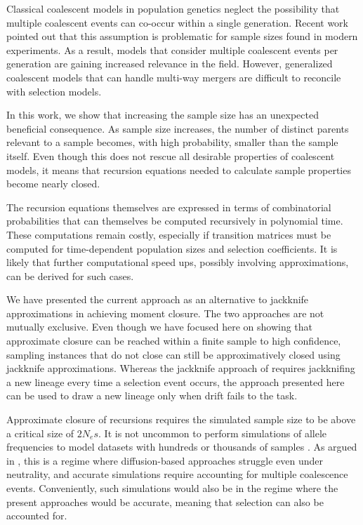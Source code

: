 \documentclass[review]{elsarticle}
\begin{document}
Classical coalescent models in population genetics neglect the possibility that multiple coalescent events 
can co-occur within a single generation. 
Recent work \citep{BhaskarEtAl2014,NelsonEtAl2019} pointed out that this
assumption is problematic for sample sizes found in modern experiments. As a result, models
that consider multiple coalescent events per generation are gaining increased relevance in the field.
However, generalized coalescent models that can handle multi-way mergers are difficult to reconcile 
with selection models.

In this work, we show that increasing the sample size has an unexpected beneficial consequence. 
As sample size increases, the number of distinct parents relevant to a sample becomes, 
with high probability, smaller than the sample itself. Even though this does not rescue
all desirable properties of coalescent models, it means that recursion equations 
needed to calculate sample properties become nearly closed. 

The recursion equations themselves  are expressed in terms of combinatorial probabilities 
that can themselves be computed recursively in polynomial time. These computations 
remain costly, especially if transition matrices must be computed for time-dependent
population sizes and selection coefficients. It is likely that further computational 
speed ups, possibly involving approximations, can be derived for such cases.  

We have presented the current approach as an alternative to jackknife approximations in 
achieving moment closure. The two approaches are not mutually exclusive. 
Even though we have focused here on showing that approximate closure can be reached within 
a finite sample to high confidence, sampling instances that do not close can still be approximatively closed
using jackknife approximations. Whereas the jackknife approach of \cite{JouganousEtAl2017} requires 
jackknifing a new lineage every time a selection event occurs, the approach presented
here can be used to draw a new lineage only when drift fails to the task. 


Approximate closure of recursions requires the simulated sample size to be above a critical size of $2N_e s.$ 
It is not uncommon to perform simulations of allele frequencies to model datasets with hundreds or 
thousands of samples \citep{Gravel:2011bg, Tennessen:2012ck}. 
 As argued in \citep{BhaskarEtAl2014},  this is a regime where diffusion-based approaches 
 struggle even under neutrality, and accurate simulations require accounting for multiple coalescence events.  
 Conveniently, such simulations would also be in the regime where the present approaches would be accurate, 
 meaning that selection can also be accounted for.
\end{document}
